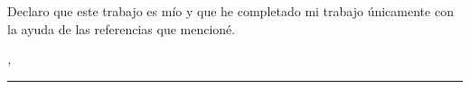%
\label{sec:declaration}
\thispagestyle{empty}

Declaro que este trabajo es mío y que he completado mi trabajo únicamente con la ayuda de las referencias que mencioné.


\bigskip

\noindent\textit{\thesisUniversityCity, \thesisDate}

\smallskip

\begin{flushright}
	\begin{minipage}{5cm}
		\rule{\textwidth}{1pt}
		\centering\thesisName
	\end{minipage}
\end{flushright}

